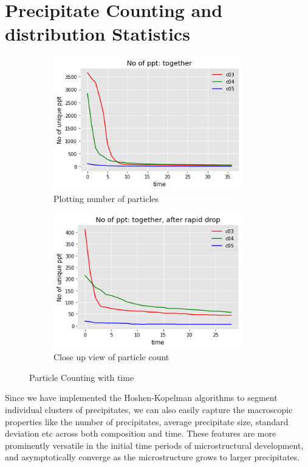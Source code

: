 \documentclass[12pt, a4paper]{report}
\begin{document}
\section{Precipitate Counting and distribution Statistics}

\begin{figure}[H]
\centering
\begin{subfigure}{.45\textwidth}
  \centering
  \includegraphics[width=0.9\textwidth]{Pictures/PPTCount/ParticleSizeDist.png}
  \caption{Plotting number of particles}
  \label{img:microstrImg}
\end{subfigure}
\begin{subfigure}{.45\textwidth}
  \centering
  \includegraphics[width=0.9\textwidth]{Pictures/PPTCount/ParticleSizeDistAfterDrop.png}
  \caption{Close up view of particle count}
  \label{img:microstrImg}
\end{subfigure}
\caption{Particle Counting with time}
\label{fig:test22}
\end{figure}
Since we have implemented the Hoshen-Kopelman algorithms to segment individual clusters of precipitates, we can also easily capture the macroscopic properties like the number of precipitates, average precipitate size, standard deviation etc across both composition and time. These features are more prominently versatile in the initial time periods of microstructural development, and asymptotically converge as the microstructure grows to larger precipitates. 
\end{document}
